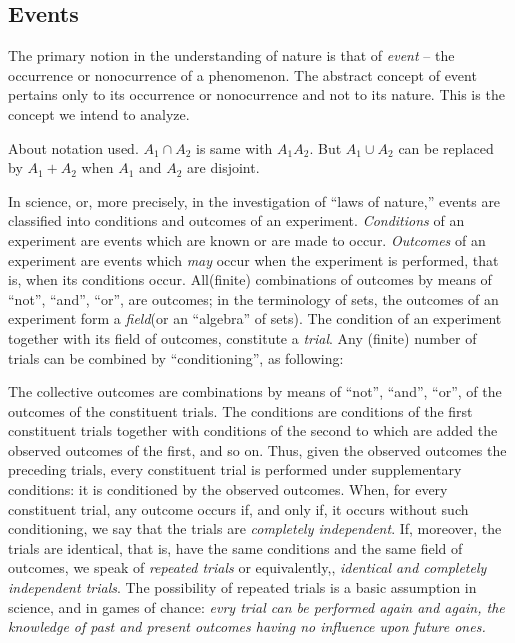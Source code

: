 \documentclass[a4paper]{book}
\newenvironment{remark}[1][Remark]{\begin{trivlist}
\item[\hskip \labelsep {\bfseries #1}]}{\end{trivlist}}
\begin{document}
\subsection{Events}

	The primary notion in the understanding of nature is that of
	\textit{event} -- the occurrence or nonocurrence of a phenomenon. The
	abstract concept of event pertains only to its occurrence or
	nonocurrence and not to its nature. This is the concept we intend to
	analyze.\cite{1977probability}

	\begin{remark}
		About notation used. $A_1 \cap A_2$ is same with $A_1A_2$. But $A_1
		\cup A_2$ can be replaced by $A_1 + A_2$ when $A_1$ and $A_2$ are
		disjoint.
	\end{remark}

	In science, or, more precisely, in the investigation of ``laws of
	nature,'' events are classified into conditions and outcomes of an
	experiment. \textit{Conditions} of an experiment are events which are known or
	are made to occur. \textit{Outcomes} of an experiment are events which
	\textit{may} occur when the experiment is performed, that is, when its
	conditions occur. All(finite) combinations of outcomes by means of
	``not'', ``and'', ``or'', are outcomes; in the terminology of sets, the
	outcomes of an experiment form a \textit{field}(or an ``algebra'' of
	sets). The condition of an experiment together with its field of
	outcomes, constitute a \textit{trial}. Any (finite) number of trials can
	be combined by ``conditioning'', as following:

	The collective outcomes are combinations by means of ``not'', ``and'',
	``or'', of the outcomes of the constituent trials. The conditions are
	conditions of the first constituent trials together with conditions of
	the second to which are added the observed outcomes of the first, and so
	on. Thus, given the observed outcomes the preceding trials, every
	constituent trial is performed under supplementary conditions: it is
	conditioned by the observed outcomes. When, for every constituent trial,
	any outcome occurs if, and only if, it occurs without such conditioning,
	we say that the trials are \textit{completely independent}. If,
	moreover, the trials are identical, that is, have the same conditions
	and the same field of outcomes, we speak of \textit{repeated trials} or
	equivalently,, \textit{identical and completely independent trials}. The
	possibility of repeated trials is a basic assumption in science, and in
	games of chance: \textit{evry trial can be performed again and again,
	the knowledge of past and present outcomes having no influence upon
	future ones.}\cite{1977probability}
\end{document}
